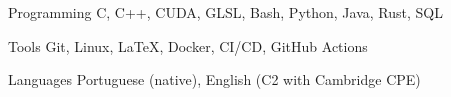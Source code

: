 
\begin{cvskills}


\cvskill
{Programming} %
{C, C++, CUDA, GLSL, Bash, Python, Java, Rust, SQL} %


\cvskill
{Tools} %
{Git, Linux, LaTeX, Docker, CI/CD, GitHub Actions} %


\cvskill
{Languages} %
{Portuguese (native), English (C2 with Cambridge CPE)} %


\end{cvskills}
